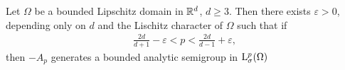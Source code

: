 \begin{thm}
  Let $\Omega$ be a bounded Lipschitz domain in $\mathbb{R}^d$, $d \geq 3$.
  Then there exists $\varepsilon > 0$, depending only on $d$ and the Lischitz character of $\Omega$ such that if
  \begin{align*}
    \frac{2d}{d + 1} - \varepsilon < p < \frac{2d}{d - 1} + \varepsilon,
  \end{align*}
  then $-A_p$ generates a bounded analytic semigroup in $\mathrm{L}^p_\sigma(\Omega)$ 
\end{thm}

